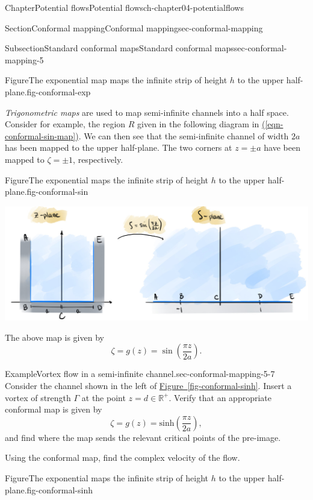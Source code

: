\documentclass[oneside,10pt,]{book}
\newcommand{\xreffont}{\relax}
\numberwithin{equation}{section}
\begin{document}
\begin{chapterptx}{Chapter}{Potential flows}{}{Potential flows}{}{}{ch-chapter04-potentialflows}
\begin{sectionptx}{Section}{Conformal mapping}{}{Conformal mapping}{}{}{sec-conformal-mapping}
\begin{subsectionptx}{Subsection}{Standard conformal maps}{}{Standard conformal maps}{}{}{sec-conformal-mapping-5}
\begin{figureptx}{Figure}{The exponential map maps the infinite strip of height \(h\) to the upper half-plane.}{fig-conformal-exp}{}
\tcblower
\end{figureptx}%
\emph{Trigonometric maps} are used to map semi-infinite channels into a half space. Consider for example, the region \(R\) given in the following diagram in \hyperref[eqn-conformal-sin-map]{({\xreffont\ref{eqn-conformal-sin-map}})}. We can then see that the semi-infinite channel of width \(2a\) has been mapped to the upper half-plane. The two corners at \(z = \pm a\) have been mapped to \(\zeta = \pm 1\), respectively.%
\begin{figureptx}{Figure}{The exponential maps the infinite strip of height \(h\) to the upper half-plane.}{fig-conformal-sin}{}%
\begin{image}{0}{1}{0}{}%
\includegraphics[width=\linewidth]{external/conformal_sin.jpg}
\end{image}%
\tcblower
\end{figureptx}%
The above map is given by%
\begin{equation}
\zeta = g(z) = \sin\left(\frac{\pi z}{2a}\right).\label{eqn-conformal-sin-map}
\end{equation}
%
\begin{example}{Example}{Vortex flow in a semi-infinite channel.}{sec-conformal-mapping-5-7}%
Consider the channel shown in the left of \hyperref[fig-conformal-sinh]{Figure~{\xreffont\ref{fig-conformal-sinh}}}. Insert a vortex of strength \(\Gamma\) at the point \(z = d \in \mathbb{R^+}\). Verify that an appropriate conformal map is given by%
\begin{equation}
\zeta = g(z) = \textrm{sinh}\left(\frac{\pi z}{2a}\right),\label{eqn-conformal-sinh}
\end{equation}
and find where the map sends the relevant critical points of the pre-image.%
\par
Using the conformal map, find the complex velocity of the flow.%
\begin{figureptx}{Figure}{The exponential maps the infinite strip of height \(h\) to the upper half-plane.}{fig-conformal-sinh}{}%
\begin{image}{0}{1}{0}{}%

\end{image}
\end{figureptx}
\end{example}
\end{subsectionptx}
\end{sectionptx}
\end{chapterptx}
\end{document}
